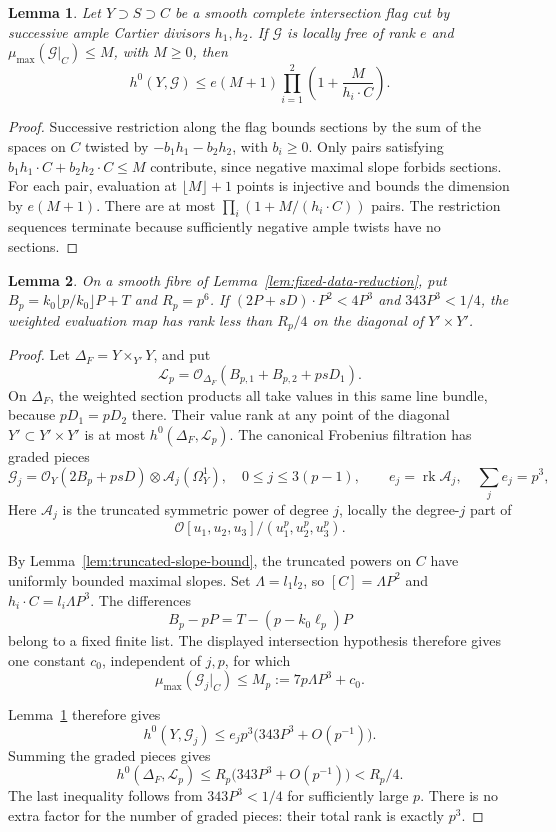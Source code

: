 \documentclass[12pt,a4paper,psamsfonts]{amsart}
\theoremstyle{definition}
\theoremstyle{plain}
\newtheorem{lemma}{Lemma}[section]
\newcommand{\OO}{\mathcal O}
\begin{document}
\begin{lemma}\label{lem:flag-section-bound}
Let $Y\supset S\supset C$ be a smooth complete intersection flag
cut by successive ample Cartier divisors $h_1,h_2$.
If $\mathcal G$ is locally free of rank $e$ and
$\mu_{\max}(\mathcal G|_C)\le M$, with $M\ge0$, then
\[
 h^0(Y,\mathcal G)\le e(M+1)
 \prod_{i=1}^2\left(1+\frac{M}{h_i\cdot C}\right).
\]
\end{lemma}
\begin{proof}
Successive restriction along the flag bounds sections by the sum
of the spaces on $C$ twisted by $-b_1h_1-b_2h_2$, with $b_i\ge0$.
Only pairs satisfying $b_1h_1\cdot C+b_2h_2\cdot C\le M$ contribute, since
negative maximal slope forbids sections. For each pair,
evaluation at $\lfloor M\rfloor+1$ points is injective and bounds
the dimension by $e(M+1)$.
There are at most $\prod_i(1+M/(h_i\cdot C))$ pairs. The restriction
sequences terminate because sufficiently negative ample twists
have no sections.
\end{proof}

\begin{lemma}\label{lem:diagonal-rank-bound}
On a smooth fibre of Lemma~\ref{lem:fixed-data-reduction}, put
$B_p=k_0\lfloor p/k_0\rfloor P+T$ and $R_p=p^6$.
If $(2P+sD)\cdot P^2<4P^3$ and $343P^3<1/4$, the weighted evaluation
map has rank less than $R_p/4$ on the diagonal of $Y'\times Y'$.
\end{lemma}
\begin{proof}
Let $\Delta_F=Y\times_{Y'}Y$, and put
\[
 \mathcal L_p=
 \OO_{\Delta_F}(B_{p,1}+B_{p,2}+psD_1).
\]
On $\Delta_F$, the weighted section products all take values
in this same line bundle, because $pD_1=pD_2$ there.
Their value rank at any point of the diagonal $Y'\subset
Y'\times Y'$ is at most $h^0(\Delta_F,\mathcal L_p)$.
The canonical Frobenius filtration
\cite[Corollary~3.5]{KS} has graded pieces
\[
 \mathcal G_j=
 \OO_Y(2B_p+psD)\otimes\mathcal A_j(\Omega_Y^1),
 \quad0\le j\le3(p-1),\qquad
 e_j=\operatorname{rk}\mathcal A_j,\quad \sum_j e_j=p^3,
\]
Here $\mathcal A_j$ is the truncated symmetric power of degree $j$,
locally the degree-$j$ part of
\[
 \OO[u_1,u_2,u_3]/(u_1^p,u_2^p,u_3^p).
\]


By Lemma~\ref{lem:truncated-slope-bound}, the truncated powers
on $C$ have uniformly bounded maximal slopes.
Set $\Lambda=l_1l_2$, so $[C]=\Lambda P^2$ and
$h_i\cdot C=l_i\Lambda P^3$. The differences
\[
 B_p-pP=T-(p-k_0\ell_p)P
\]
belong to a fixed finite list. The displayed intersection
hypothesis therefore gives one constant $c_0$, independent of
$j,p$, for which
\[
 \mu_{\max}(\mathcal G_j|_C)
 \le M_p:=7p\Lambda P^3+c_0.
\]

Lemma~\ref{lem:flag-section-bound} therefore gives
\[
 h^0(Y,\mathcal G_j)
 \le e_jp^3\bigl(343P^3+O(p^{-1})\bigr).
\]
Summing the graded pieces gives
\begin{equation}\label{eq:diagonal-rank}
 h^0(\Delta_F,\mathcal L_p)
 \le R_p\bigl(343P^3+O(p^{-1})\bigr)<R_p/4.
\end{equation}
The last inequality follows from $343P^3<1/4$ for sufficiently
large $p$.
There is no extra factor for the number of graded pieces:
their total rank is exactly $p^3$.
\end{proof}
\end{document}
